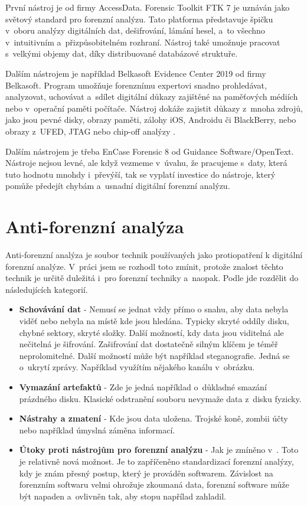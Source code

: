 \documentclass[thesis=B,czech]{FITthesis}[2012/06/26]
\begin{document}
První nástroj je od firmy AccessData. Forensic Toolkit FTK 7 je uznáván jako světový standard pro forenzní analýzu. Tato platforma představuje špičku v~oboru analýzy digitálních dat, dešifrování, lámání hesel, a~to všechno v~intuitivním a~přizpůsobitelném rozhraní. Nástroj také umožnuje pracovat s~velkými objemy dat, díky distribuované databázové struktuře.

Dalším nástrojem je například Belkasoft Evidence Center 2019 od firmy Belkasoft. Program umožňuje forenznímu expertovi snadno prohledávat, analyzovat, uchovávat a~sdílet digitální důkazy zajištěné na paměťových médiích nebo v~operační paměti počítače. Nástroj dokáže zajistit důkazy z~mnoha zdrojů, jako jsou pevné disky, obrazy paměti, zálohy iOS, Androidu či BlackBerry, nebo obrazy z~UFED, JTAG nebo chip-off analýzy \cite{for_soft}.

Dalším nástrojem je třeba EnCase Forensic 8 od Guidance Software/\-OpenText. Nástroje nejsou levné, ale když vezmeme v~úvahu, že pracujeme s~daty, která tuto hodnotu mnohdy i~převýší, tak se vyplatí investice do nástroje, který pomůže předejít chybám a~usnadní digitální forenzní analýzu.

\chapter{Anti-forenzní analýza}

Anti-forenzní analýza je soubor technik používaných jako protiopatření k digitální forenzní analýze. V~práci jsem se rozhodl toto zmínit, protože znalost těchto technik je určitě duležitá i~pro forenzní techniky a~naopak. Podle \cite{anti-prezi} jde rozdělit do následujících kategorií.

\begin{itemize}

\item \textbf{Schovávání dat} - Nemusí se jednat vždy přímo o snahu, aby data nebyla viděť nebo nebyla na místě kde jsou hledána. Typicky skryté oddíly disku, chybné sektory, skryté složky. Další možností, kdy data jsou viditelná ale nečitelná je šifrování. Zašifrování dat dostatečně silným klíčem je téměř neprolomitelné. Další možností může být například steganografie. Jedná se o~ukrytí zprávy. Například využítím nějakého kanálu v~obrázku.
\item \textbf{Vymazání artefaktů} - Zde je jedná například o~důkladné smazání prázdného disku. Klasické odstranění souboru nevymaže data z~disku fyzicky. 
\item \textbf{Nástrahy a zmatení} - Kde jsou data uložena. Trojské koně, zombii účty nebo například úmyslná záměna informací. 
\item \textbf{Útoky proti nástrojům pro forenzní analýzu} - Jak je zmíněno v~\cite{anti-prezi}. Toto je relativně nová možnost. Je to zapříčeněno standardizací forenzní analýzy, kdy je znám přesný postup, který je prováděn softwarem. Závislost na forenzním softwaru velmi ohrožuje zkoumaná data, forenzní software může být napaden a~ovlivněn tak, aby stopu napřílad zahladil. 

\end{itemize}
\end{document}
